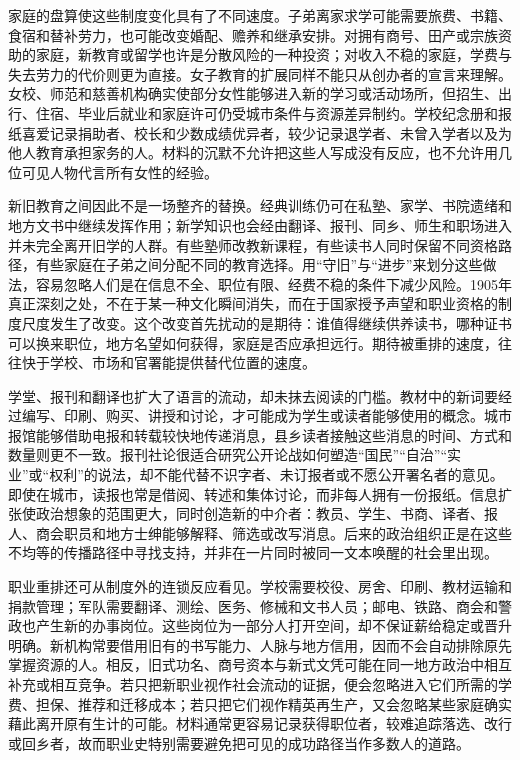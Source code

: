 家庭的盘算使这些制度变化具有了不同速度。子弟离家求学可能需要旅费、书籍、食宿和替补劳力，也可能改变婚配、赡养和继承安排。对拥有商号、田产或宗族资助的家庭，新教育或留学也许是分散风险的一种投资；对收入不稳的家庭，学费与失去劳力的代价则更为直接。女子教育的扩展同样不能只从创办者的宣言来理解。女校、师范和慈善机构确实使部分女性能够进入新的学习或活动场所，但招生、出行、住宿、毕业后就业和家庭许可仍受城市条件与资源差异制约。学校纪念册和报纸喜爱记录捐助者、校长和少数成绩优异者，较少记录退学者、未曾入学者以及为他人教育承担家务的人。材料的沉默不允许把这些人写成没有反应，也不允许用几位可见人物代言所有女性的经验。

新旧教育之间因此不是一场整齐的替换。经典训练仍可在私塾、家学、书院遗绪和地方文书中继续发挥作用；新学知识也会经由翻译、报刊、同乡、师生和职场进入并未完全离开旧学的人群。有些塾师改教新课程，有些读书人同时保留不同资格路径，有些家庭在子弟之间分配不同的教育选择。用“守旧”与“进步”来划分这些做法，容易忽略人们是在信息不全、职位有限、经费不稳的条件下减少风险。1905年真正深刻之处，不在于某一种文化瞬间消失，而在于国家授予声望和职业资格的制度尺度发生了改变。这个改变首先扰动的是期待：谁值得继续供养读书，哪种证书可以换来职位，地方名望如何获得，家庭是否应承担远行。期待被重排的速度，往往快于学校、市场和官署能提供替代位置的速度。

学堂、报刊和翻译也扩大了语言的流动，却未抹去阅读的门槛。教材中的新词要经过编写、印刷、购买、讲授和讨论，才可能成为学生或读者能够使用的概念。城市报馆能够借助电报和转载较快地传递消息，县乡读者接触这些消息的时间、方式和数量则更不一致。报刊社论很适合研究公开论战如何塑造“国民”“自治”“实业”或“权利”的说法，却不能代替不识字者、未订报者或不愿公开署名者的意见。即使在城市，读报也常是借阅、转述和集体讨论，而非每人拥有一份报纸。信息扩张使政治想象的范围更大，同时创造新的中介者：教员、学生、书商、译者、报人、商会职员和地方士绅能够解释、筛选或改写消息。后来的政治组织正是在这些不均等的传播路径中寻找支持，并非在一片同时被同一文本唤醒的社会里出现。

职业重排还可从制度外的连锁反应看见。学校需要校役、房舍、印刷、教材运输和捐款管理；军队需要翻译、测绘、医务、修械和文书人员；邮电、铁路、商会和警政也产生新的办事岗位。这些岗位为一部分人打开空间，却不保证薪给稳定或晋升明确。新机构常要借用旧有的书写能力、人脉与地方信用，因而不会自动排除原先掌握资源的人。相反，旧式功名、商号资本与新式文凭可能在同一地方政治中相互补充或相互竞争。若只把新职业视作社会流动的证据，便会忽略进入它们所需的学费、担保、推荐和迁移成本；若只把它们视作精英再生产，又会忽略某些家庭确实藉此离开原有生计的可能。材料通常更容易记录获得职位者，较难追踪落选、改行或回乡者，故而职业史特别需要避免把可见的成功路径当作多数人的道路。

